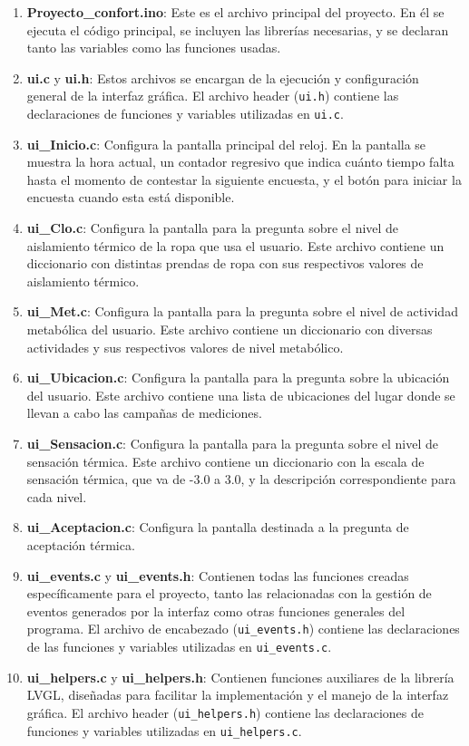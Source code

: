 \documentclass[
  12pt,
  letterpaper,
  DIV=11,
  numbers=noendperiod]{scrreport}
\begin{document}
\begin{enumerate}
\def\labelenumi{\arabic{enumi}.}
\item
  \textbf{Proyecto\_confort.ino}: Este es el archivo principal del
  proyecto. En él se ejecuta el código principal, se incluyen las
  librerías necesarias, y se declaran tanto las variables como las
  funciones usadas.
\item
  \textbf{ui.c} y \textbf{ui.h}: Estos archivos se encargan de la
  ejecución y configuración general de la interfaz gráfica. El archivo
  header (\texttt{ui.h}) contiene las declaraciones de funciones y
  variables utilizadas en \texttt{ui.c}.
\item
  \textbf{ui\_Inicio.c}: Configura la pantalla principal del reloj. En
  la pantalla se muestra la hora actual, un contador regresivo que
  indica cuánto tiempo falta hasta el momento de contestar la siguiente
  encuesta, y el botón para iniciar la encuesta cuando esta está
  disponible.
\item
  \textbf{ui\_Clo.c}: Configura la pantalla para la pregunta sobre el
  nivel de aislamiento térmico de la ropa que usa el usuario. Este
  archivo contiene un diccionario con distintas prendas de ropa con sus
  respectivos valores de aislamiento térmico.
\item
  \textbf{ui\_Met.c}: Configura la pantalla para la pregunta sobre el
  nivel de actividad metabólica del usuario. Este archivo contiene un
  diccionario con diversas actividades y sus respectivos valores de
  nivel metabólico.
\item
  \textbf{ui\_Ubicacion.c}: Configura la pantalla para la pregunta sobre
  la ubicación del usuario. Este archivo contiene una lista de
  ubicaciones del lugar donde se llevan a cabo las campañas de
  mediciones.
\item
  \textbf{ui\_Sensacion.c}: Configura la pantalla para la pregunta sobre
  el nivel de sensación térmica. Este archivo contiene un diccionario
  con la escala de sensación térmica, que va de -3.0 a 3.0, y la
  descripción correspondiente para cada nivel.
\item
  \textbf{ui\_Aceptacion.c}: Configura la pantalla destinada a la
  pregunta de aceptación térmica.
\item
  \textbf{ui\_events.c} y \textbf{ui\_events.h}: Contienen todas las
  funciones creadas específicamente para el proyecto, tanto las
  relacionadas con la gestión de eventos generados por la interfaz como
  otras funciones generales del programa. El archivo de encabezado
  (\texttt{ui\_events.h}) contiene las declaraciones de las funciones y
  variables utilizadas en \texttt{ui\_events.c}.
\item
  \textbf{ui\_helpers.c} y \textbf{ui\_helpers.h}: Contienen funciones
  auxiliares de la librería LVGL, diseñadas para facilitar la
  implementación y el manejo de la interfaz gráfica. El archivo header
  (\texttt{ui\_helpers.h}) contiene las declaraciones de funciones y
  variables utilizadas en \texttt{ui\_helpers.c}.
\end{enumerate}
\end{document}

